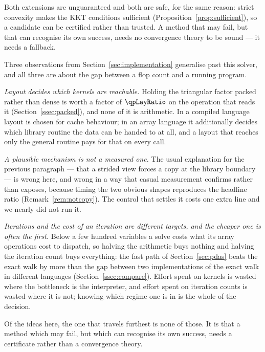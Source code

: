 Both extensions are unguaranteed and both are safe, for the same reason: strict
convexity makes the KKT conditions sufficient (Proposition~\ref{prop:sufficient}),
so a candidate can be certified rather than trusted. A method that may fail, but
that can recognise its own success, needs no convergence theory to be sound --- it
needs a fallback.

Three observations from Section~\ref{sec:implementation} generalise past this
solver, and all three are about the gap between a flop count and a running
program.

\emph{Layout decides which kernels are reachable.} Holding the triangular factor
packed rather than dense is worth a factor of $\qpLayRatio$ on the operation that
reads it (Section~\ref{ssec:packed}), and none of it is arithmetic. In a compiled
language layout is chosen for cache behaviour; in an array language it
additionally decides which library routine the data can be handed to at all, and a
layout that reaches only the general routine pays for that on every call.

\emph{A plausible mechanism is not a measured one.} The usual explanation for the
previous paragraph --- that a strided view forces a copy at the library boundary
--- is wrong here, and wrong in a way that casual measurement confirms rather than
exposes, because timing the two obvious shapes reproduces the headline ratio
(Remark~\ref{rem:notcopy}). The control that settles it costs one extra line and
we nearly did not run it.

\emph{Iterations and the cost of an iteration are different targets, and the
cheaper one is often the first.} Below a few hundred variables a solve costs what
its array operations cost to dispatch, so halving the arithmetic buys nothing and
halving the iteration count buys everything: the fast path of
Section~\ref{sec:pdas} beats the exact walk by more than the gap between two
implementations of the exact walk in different languages
(Section~\ref{ssec:compare}). Effort spent on kernels is wasted where the
bottleneck is the interpreter, and effort spent on iteration counts is wasted
where it is not; knowing which regime one is in is the whole of the decision.

Of the ideas here, the one that travels furthest is none of those. It is that a
method which may fail, but which can recognise its own success, needs a
certificate rather than a convergence theory.
